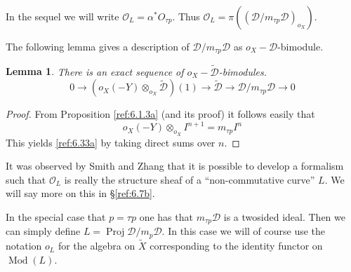 \documentclass{amsproc}
\def\Dscr{{\mathcal D}}
\def\Oscr{{\mathcal O}}
\def\Proj{\operatorname {Proj}}
\def\Qch{\operatorname {Mod}}
\def\r{\rightarrow}
\newtheorem{lemmas}{Lemma}[subsection]
\theoremstyle{definition}
\theoremstyle{remark}
\numberwithin{equation}{section}
\numberwithin{table}{section}
\numberwithin{figure}{section}
\begin{document}
In the sequel we will write $\Oscr_L=\alpha^\ast O_{\tau p}$. 
Thus $\Oscr_L=\pi((\Dscr/m_{\tau p}\Dscr)_{o_X})$.

The following lemma gives a description of $\Dscr/m_{\tau p}\Dscr$
as $o_X-\Dscr$-bimodule.
\begin{lemmas}
There is an exact sequence of
$o_X-\tilde{\Dscr}$-bimodules.
\begin{equation}
\label{ref:6.33a}
0\r (o_X(-Y)\otimes_{o_X}\tilde{\Dscr})(1)\r \tilde{\Dscr}\r
\Dscr/m_{\tau   p}\Dscr\r 0
\end{equation}
\end{lemmas}
\begin{proof} 
From Proposition \ref{ref:6.1.3a} (and its proof) it follows easily that
\[
o_X(-Y)\otimes_{o_X} I^{n+1}=m_{\tau p} I^n
\]
This yields \eqref{ref:6.33a} by taking  direct sums over $n$.
\end{proof}




It was
observed by Smith and Zhang \cite{SmithZhang} that it is possible to 
develop a formalism  such that $\Oscr_L$ is really
the structure sheaf of a ``non-commutative curve'' $L$. We will say more
on this in \S\ref{ref:6.7b}.


In the special case that $p=\tau p$ one has that $m_{\tau p}\Dscr$ is
a twosided ideal. Then we can
simply define $L=\Proj \Dscr/m_p\Dscr$. In this case we will of course
use the notation $o_L$ for the algebra on $\tilde{X}$ corresponding to
the identity functor on $\Qch(L)$.
\end{document}
